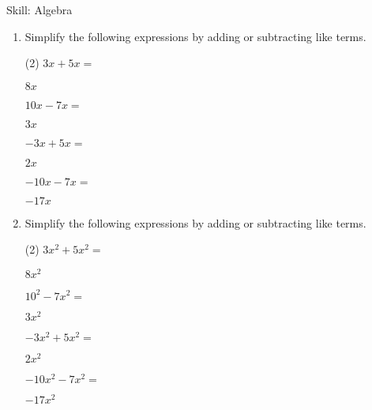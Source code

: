\begin{bxTip}[colbacktitle=bkcolor]{Skill: Algebra}

\begin{enumerate} [leftmargin=0cm] 

\item Simplify the following expressions by adding or subtracting like terms.
\begin{tasks}[label=(\alph*), after-item-skip=2pt,after-skip=3pt, label-width=4ex](2)
    \task  $ 3x+5x=           $                               \begin{envFillIn} $  8x         $ \end{envFillIn}
    \task  $ 10x-7x=          $                               \begin{envFillIn} $  3x         $ \end{envFillIn}
    \task  $ -3x+5x=          $                               \begin{envFillIn} $  2x         $ \end{envFillIn}
    \task  $ -10x-7x=         $                               \begin{envFillIn} $  -17x       $ \end{envFillIn} 
\end{tasks}

\item Simplify the following expressions by adding or subtracting like terms.
\begin{tasks}[label=(\alph*), after-item-skip=2pt,after-skip=3pt, label-width=4ex](2)
    \task  $ 3x^2+5x^2=           $                               \begin{envFillIn} $  8x^2         $ \end{envFillIn}
    \task  $ 10^2-7x^2=           $                               \begin{envFillIn} $  3x^2         $ \end{envFillIn}
    \task  $ -3x^2+5x^2=          $                               \begin{envFillIn} $  2x^2         $ \end{envFillIn}
    \task  $ -10x^2-7x^2=         $                               \begin{envFillIn} $  -17x^2       $ \end{envFillIn} 
\end{tasks}


\end{enumerate}
\end{bxTip}
